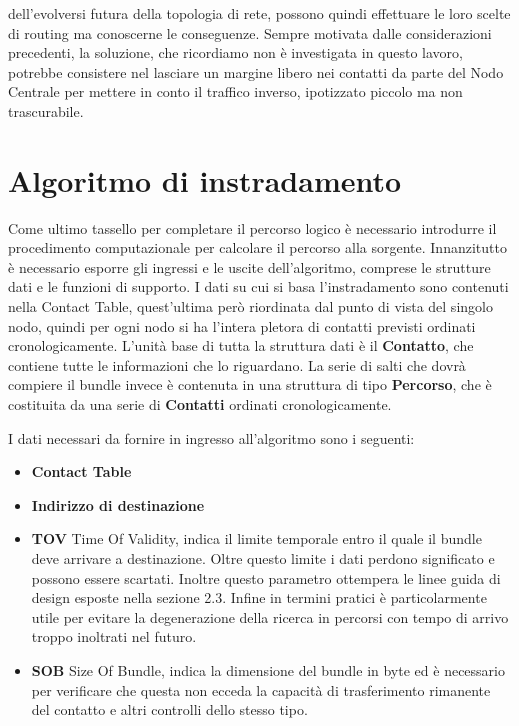 \documentclass[12pt,a4paper,oneside]{book}
\begin{document}
dell'evolversi futura della topologia di rete, possono quindi effettuare le loro scelte di routing ma conoscerne le conseguenze. Sempre motivata dalle considerazioni precedenti, la soluzione, che ricordiamo non è investigata in questo lavoro, potrebbe consistere nel lasciare un margine libero nei contatti da parte del Nodo Centrale per mettere in conto il traffico inverso, ipotizzato piccolo ma non trascurabile. 
		
		

		\section{Algoritmo di instradamento}
		
		Come ultimo tassello per completare il percorso logico è necessario introdurre il procedimento computazionale per calcolare il percorso alla sorgente. Innanzitutto è necessario esporre gli ingressi e le uscite dell'algoritmo, comprese le strutture dati e le funzioni di supporto. I dati su cui si basa l'instradamento sono contenuti nella Contact Table, quest'ultima però riordinata dal punto di vista del singolo nodo, quindi per ogni nodo si ha l'intera pletora di contatti previsti ordinati cronologicamente. L'unità base di tutta la struttura dati è il {\bf Contatto}, che contiene tutte le informazioni che lo riguardano. La serie di salti che dovrà compiere il bundle invece è contenuta in una struttura di tipo {\bf Percorso}, che è costituita da una serie di {\bf Contatti} ordinati cronologicamente. 
		
		I dati necessari da fornire in ingresso all'algoritmo sono i seguenti:
		\begin{itemize}
			\item {\bf Contact Table}
			\item {\bf Indirizzo di destinazione}
			\item {\bf TOV} Time Of Validity, indica il limite temporale entro il quale il bundle deve arrivare a destinazione. Oltre questo limite i dati perdono significato e possono essere scartati. Inoltre questo parametro ottempera le linee guida di design esposte nella sezione 2.3. Infine in termini pratici è particolarmente utile per evitare la degenerazione della ricerca in percorsi con tempo di arrivo troppo inoltrati nel futuro. 
			\item {\bf SOB}	Size Of Bundle, indica la dimensione del bundle in byte ed è necessario per verificare che questa non ecceda la capacità di trasferimento rimanente del contatto e altri controlli dello stesso tipo. 
		\end{itemize}
		
\end{document}
